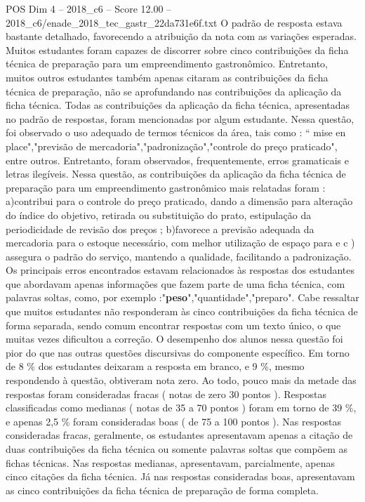 \begin{textsample}{POS Dim 4 – 2018\_c6 – Score 12.00 – 2018\_c6/enade\_2018\_tec\_gastr\_22da731e6f.txt}
O padrão de resposta estava bastante detalhado, favorecendo a atribuição da nota com as variações esperadas.
Muitos estudantes foram capazes de discorrer sobre cinco contribuições da ficha técnica de preparação para um empreendimento gastronômico.
Entretanto, muitos outros estudantes também apenas citaram as contribuições da ficha técnica de preparação, não se aprofundando nas contribuições da aplicação da ficha técnica.
Todas as contribuições da aplicação da ficha técnica, apresentadas no padrão de respostas, foram mencionadas por algum estudante.
Nessa questão, foi observado o uso adequado de termos técnicos da área, tais como : “ mise en place","previsão de mercadoria","padronização","controle do preço praticado", entre outros.
Entretanto, foram observados, frequentemente, erros gramaticais e letras ilegíveis.
Nessa questão, as contribuições da aplicação da ficha técnica de preparação para um empreendimento gastronômico mais relatadas foram : a)contribui para o controle do preço praticado, dando a dimensão para alteração do índice do objetivo, retirada ou substituição do prato, estipulação da periodicidade de revisão dos preços ; b)favorece a previsão adequada da mercadoria para o estoque necessário, com melhor utilização de espaço para e c ) assegura o padrão do serviço, mantendo a qualidade, facilitando a padronização.
Os principais erros encontrados estavam relacionados às respostas dos estudantes que abordavam apenas informações que fazem parte de uma ficha técnica, com palavras soltas, como, por exemplo :"\textbf{peso}","quantidade","preparo".
Cabe ressaltar que muitos estudantes não responderam às cinco contribuições da ficha técnica de forma separada, sendo comum encontrar respostas com um texto único, o que muitas vezes dificultou a correção.
O desempenho dos alunos nessa questão foi pior do que nas outras questões discursivas do componente específico.
Em torno de 8 \% dos estudantes deixaram a resposta em branco, e 9 \%, mesmo respondendo à questão, obtiveram nota zero.
Ao todo, pouco mais da metade das respostas foram consideradas fracas ( notas de zero 30 pontos ).
Respostas classificadas como medianas ( notas de 35 a 70 pontos ) foram em torno de 39 \%, e apenas 2,5 \% foram consideradas boas ( de 75 a 100 pontos ).
Nas respostas consideradas fracas, geralmente, os estudantes apresentavam apenas a citação de duas contribuições da ficha técnica ou somente palavras soltas que compõem as fichas técnicas.
Nas respostas medianas, apresentavam, parcialmente, apenas cinco citações da ficha técnica.
Já nas respostas consideradas boas, apresentavam as cinco contribuições da ficha técnica de preparação de forma completa.

\end{textsample}
